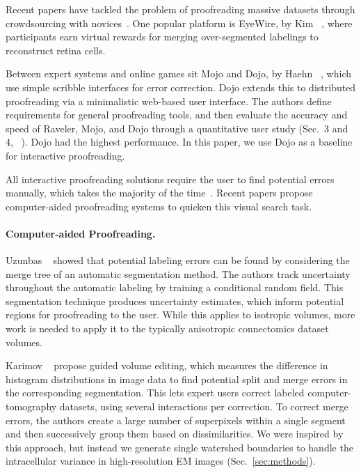 Recent papers have tackled the problem of proofreading massive datasets through crowdsourcing with novices~\cite{saalfeld09,anderson2011,Giuly2013DP2}. One popular platform is EyeWire, by Kim \etal~\cite{eyewire_nature}, where participants earn virtual rewards for merging over-segmented labelings to reconstruct retina cells.

Between expert systems and online games sit Mojo and Dojo, by Haehn
\etal~\cite{haehn_dojo_2014,Neuroblocks}, which use simple scribble interfaces
for error correction. Dojo extends this to distributed proofreading via a
minimalistic web-based user interface. The authors define requirements for
general proofreading tools, and then evaluate the accuracy and speed of Raveler,
Mojo, and Dojo through a quantitative user study (Sec.~3 and
4, ~\cite{haehn_dojo_2014}). Dojo had the highest performance. In this paper, we
use Dojo as a baseline for interactive proofreading.

All interactive proofreading solutions require the user to find potential errors manually, which takes the majority of the time~\cite{proofreading_bottleneck,haehn_dojo_2014}. Recent papers propose computer-aided proofreading systems to quicken this visual search task.

\paragraph{Computer-aided Proofreading.} Uzunbas \etal~\cite{uzunbas} showed that potential labeling errors can be found by considering the merge tree of an automatic segmentation method. The authors track uncertainty throughout the automatic labeling by training a conditional random field. This segmentation technique produces uncertainty estimates, which inform potential regions for proofreading to the user. While this applies to isotropic volumes, more work is needed to apply it to the typically anisotropic connectomics dataset volumes.


Karimov \etal~\cite{karimov_guided_volume_editing} propose guided volume editing, which measures the difference in histogram distributions in image data to find potential split and merge errors in the corresponding segmentation. This lets expert users correct labeled computer-tomography datasets, using several interactions per correction. To correct merge errors, the authors create a large number of superpixels within a single segment and then successively group them based on dissimilarities. We were inspired by this approach, but instead we generate single watershed boundaries to handle the intracellular variance in high-resolution EM images (Sec.~\ref{sec:methods}). 

